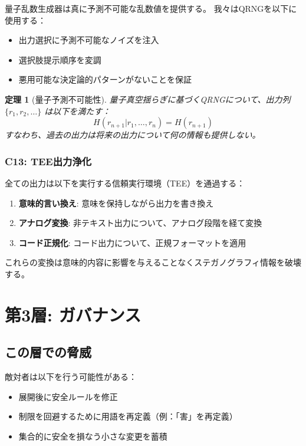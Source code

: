 \documentclass[11pt,a4paper]{article}
\newtheorem{theorem}{定理}
\begin{document}
量子乱数生成器は真に予測不可能な乱数値を提供する。
我々はQRNGを以下に使用する：
\begin{itemize}
    \item 出力選択に予測不可能なノイズを注入
    \item 選択肢提示順序を変調
    \item 悪用可能な決定論的パターンがないことを保証
\end{itemize}

\begin{theorem}[量子予測不可能性]
量子真空揺らぎに基づくQRNGについて、出力列 $\{r_1, r_2, \ldots\}$ は以下を満たす：
\begin{equation}
H(r_{n+1} | r_1, \ldots, r_n) = H(r_{n+1})
\end{equation}
すなわち、過去の出力は将来の出力について何の情報も提供しない。
\end{theorem}

\subsubsection{C13: TEE出力浄化}

全ての出力は以下を実行する信頼実行環境（TEE）を通過する：
\begin{enumerate}
    \item \textbf{意味的言い換え}: 意味を保持しながら出力を書き換え
    \item \textbf{アナログ変換}: 非テキスト出力について、アナログ段階を経て変換
    \item \textbf{コード正規化}: コード出力について、正規フォーマットを適用
\end{enumerate}

これらの変換は意味的内容に影響を与えることなくステガノグラフィ情報を破壊する。

\section{第3層: ガバナンス}
\label{sec:layer3}

\subsection{この層での脅威}

敵対者は以下を行う可能性がある：
\begin{itemize}
    \item 展開後に安全ルールを修正
    \item 制限を回避するために用語を再定義（例：「害」を再定義）
    \item 集合的に安全を損なう小さな変更を蓄積
\end{itemize}
\end{document}
